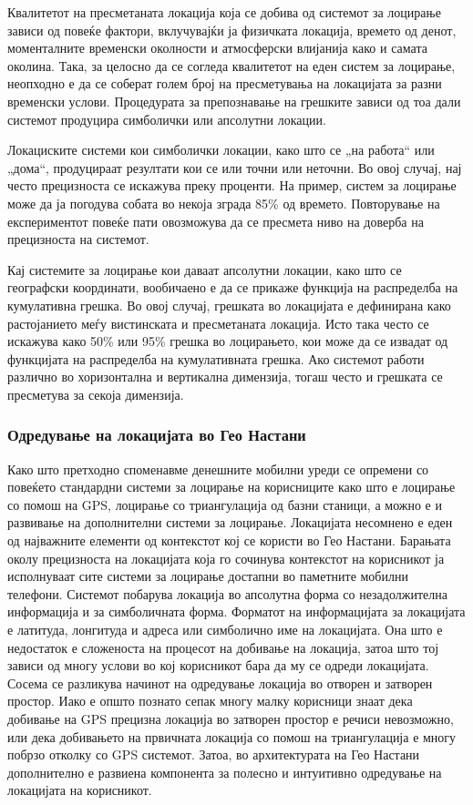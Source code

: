 Квалитетот на пресметаната локација која се добива од системот за лоцирање
зависи од повеќе фактори, вклучувајќи ја физичката локација, времето од денот,
моменталните временски околности и атмосферски влијанија како и самата околина.
Така, за целосно да се согледа квалитетот на еден систем за лоцирање, неопходно
е да се соберат голем број на пресметувања на локацијата за разни временски
услови. Процедурата за препознавање на грешките зависи од тоа дали системот
продуцира симболички или апсолутни локации. 

Локациските системи кои симболички
локации, како што се „на работа“ или „дома“, продуцираат резултати кои се или
точни или неточни. Во овој случај, нај често прецизноста се искажува преку
проценти. На пример, систем за лоцирање може да ја погодува собата во некоја
зграда 85\% од времето. Повторување на експериментот повеќе пати овозможува да
се пресмета ниво на доверба на прецизноста на системот. 

Кај системите за лоцирање
кои даваат апсолутни локации, како што се географски координати, вообичаено е да
се прикаже функција на распределба на кумулативна грешка. Во овој случај,
грешката во локацијата е дефинирана како растојанието меѓу вистинската и
пресметаната локација. Исто така често се искажува како 50\% или 95\% грешка во
лоцирањето, кои може да се извадат од функцијата на распределба на кумулативната
грешка. Ако системот работи различно во хоризонтална и вертикална димензија,
тогаш често и грешката се пресметува за секоја димензија. 

\subsubsection{Одредување на локацијата во Гео Настани} 

Како што претходно споменавме денешните
мобилни уреди се опремени со повеќето стандардни системи за лоцирање на корисниците како што е
лоцирање со помош на GPS, лоцирање со триангулација од базни станици, а можно е
и развивање на дополнителни системи за лоцирање. Локацијата несомнено е еден од
најважните елементи од контекстот кој се користи во Гео Настани. Барањата околу
прецизноста на локацијата која го сочинува контекстот на корисникот ја
исполнуваат сите системи за лоцирање достапни во паметните мобилни телефони.
Системот побарува локација во апсолутна форма со незадолжителна информација и за
симболичната форма. Форматот на информацијата за локацијата е латитуда,
лонгитуда и адреса или симболично име на локацијата. Она што е недостаток е
сложеноста на процесот на добивање на локација, затоа што тој зависи од многу
услови во кој корисникот бара да му се одреди локацијата. Сосема се разликува
начинот на одредување локација во отворен и затворен простор. Иако е општо
познато сепак многу малку корисници знаат дека добивање на GPS прецизна локација
во затворен простор е речиси невозможно, или дека добивањето на првичната
локација со помош на триангулација е многу побрзо отколку со GPS системот.
Затоа, во архитектурата на Гео Настани дополнително е развиена компонента за
полесно и интуитивно одредување на локацијата на корисникот. 

